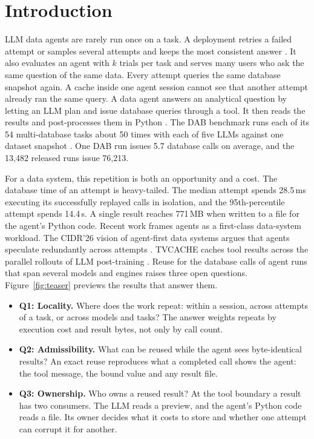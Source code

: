 \section{Introduction}
\label{sec:intro}



LLM data agents are rarely run once on a task. A deployment retries a failed attempt or samples several attempts and
keeps the most consistent answer \cite{wang2023selfconsistency,brown2024monkeys}. It also evaluates an agent with $k$
trials per task and serves many users who ask the same question of the same data. Every attempt queries the same
database snapshot again. A cache inside one agent session cannot see that another attempt already ran the same query.
A data agent answers an analytical question by letting an LLM plan and issue database queries through a tool. It then
reads the results and post-processes them in Python \cite{ma2026dab,yao2023react}. The DAB benchmark runs each of its
54 multi-database tasks about 50 times with each of five LLMs against one dataset snapshot \cite{ma2026dab}. One DAB
run issues 5.7 database calls on average, and the 13,482 released runs issue 76,213.

For a data system, this repetition is both an opportunity and a cost. The database time of an attempt is
heavy-tailed. The median attempt spends 28.5\,ms executing its successfully replayed calls in isolation, and the
95th-percentile attempt spends 14.4\,s. A single result reaches 771\,MB when written to a file for the agent's Python
code. Recent work frames agents as a first-class data-system workload. The CIDR'26 vision of agent-first data systems
argues that agents speculate redundantly across attempts \cite{liu2026overlords}. TVCACHE caches tool results across
the parallel rollouts of LLM post-training \cite{kumar2026tvcache}. Reuse for the database calls of agent runs that
span several models and engines raises three open questions. Figure~\ref{fig:teaser} previews the results that answer them.

\begin{itemize}
  \item \textbf{Q1: Locality.} Where does the work repeat: within a session, across attempts of a task, or across
  models and tasks? The answer weights repeats by execution cost and result bytes, not only by call count.
  \item \textbf{Q2: Admissibility.} What can be reused while the agent sees byte-identical results? An exact reuse
  reproduces what a completed call shows the agent: the tool message, the bound value and any result file.
  \item \textbf{Q3: Ownership.} Who owns a reused result? At the tool boundary a result has two consumers. The LLM reads a preview, and the agent's Python code reads a file. Its owner decides what it costs to store and whether
  one attempt can corrupt it for another.
\end{itemize}

